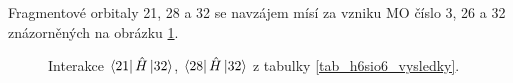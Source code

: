\documentclass[
  digital, %
  table,   %
  lof,     %
  lot,     %
]{fithesis3}
\begin{document}
Fragmentové orbitaly  21, 28 a 32 se navzájem mísí za vzniku MO číslo 3, 26 a 32 znázorněných na obrázku \ref{obr_h6sio6_vysledky_II}.   
\begin{figure}
\begin{center}
\caption{Interakce $\bra{21}{\hat{H}}\ket{32}$, $\bra{28}{\hat{H}}\ket{32}$ z tabulky \ref{tab_h6sio6_vysledky}.}

\label{obr_h6sio6_vysledky_II}\end{center}
\end{figure} 
 
\end{document}
